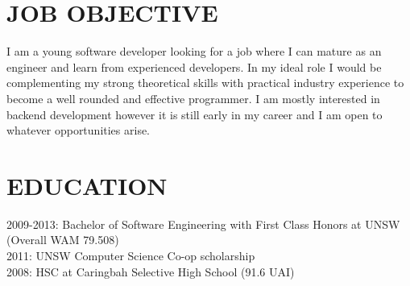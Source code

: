\documentclass{res}
\begin{document}
 


\address{16A Old Forest Rd \\  Lugarno, NSW 2210
         \\  grasevski@gmail.com
         \\  0405 634 067}
                                  
\begin{resume}

\section{JOB OBJECTIVE}          
    I am a young software developer looking for a job where I can mature as an engineer and learn from experienced developers. In my ideal role I would be complementing my strong theoretical skills with practical industry experience to become a well rounded and effective programmer. I am mostly interested in backend development however it is still early in my career and I am open to whatever opportunities arise.
 
\section{EDUCATION}          
    2009-2013: Bachelor of Software Engineering with First Class Honors at UNSW (Overall WAM 79.508) \\
    2011: UNSW Computer Science Co-op scholarship \\
    2008: HSC at Caringbah Selective High School (91.6 UAI)

 

\end{resume}
\end{document}
